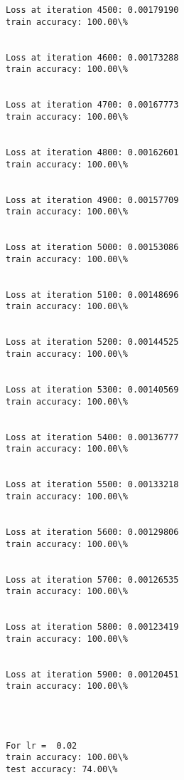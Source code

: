 \documentclass[11pt]{article}
\begin{document}
\begin{Verbatim}[commandchars=\\\{\}]
Loss at iteration 4500:	0.00179190
train accuracy: 100.00\%


Loss at iteration 4600:	0.00173288
train accuracy: 100.00\%


Loss at iteration 4700:	0.00167773
train accuracy: 100.00\%


Loss at iteration 4800:	0.00162601
train accuracy: 100.00\%


Loss at iteration 4900:	0.00157709
train accuracy: 100.00\%


Loss at iteration 5000:	0.00153086
train accuracy: 100.00\%


Loss at iteration 5100:	0.00148696
train accuracy: 100.00\%


Loss at iteration 5200:	0.00144525
train accuracy: 100.00\%


Loss at iteration 5300:	0.00140569
train accuracy: 100.00\%


Loss at iteration 5400:	0.00136777
train accuracy: 100.00\%


Loss at iteration 5500:	0.00133218
train accuracy: 100.00\%


Loss at iteration 5600:	0.00129806
train accuracy: 100.00\%


Loss at iteration 5700:	0.00126535
train accuracy: 100.00\%


Loss at iteration 5800:	0.00123419
train accuracy: 100.00\%


Loss at iteration 5900:	0.00120451
train accuracy: 100.00\%




For lr =  0.02
train accuracy: 100.00\%
test accuracy: 74.00\%





    \end{Verbatim}
\end{document}
